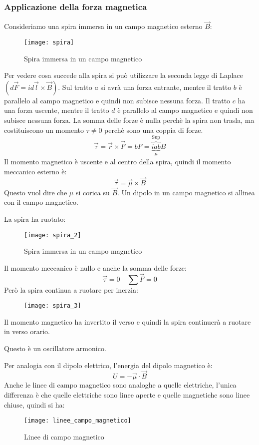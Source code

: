 \documentclass[a4paper]{article}
\begin{document}
\subsubsection{Applicazione della forza magnetica}
\begin{example}
  Consideriamo una spira immersa in un campo magnetico esterno \( \vec{B} \):
  \begin{figure}[H]
    \centering
    \texttt{[image: spira]}
    \caption{Spira immersa in un campo magnetico}
  \end{figure}
  \noindent
  Per vedere cosa succede alla spira si può utilizzare la seconda legge di Laplace
  \( \left( d\vec{F} = i d\vec{l} \times \vec{B} \right) \).
  Sul tratto \( a \) si avrà una forza entrante, mentre il tratto \( b \) è parallelo
  al campo magnetico e quindi non subisce nessuna forza. Il tratto \( c \) ha una
  forza uscente, mentre il tratto \( d \) è parallelo al campo magnetico e quindi
  non subisce nessuna forza.
  La somma delle forze è nulla perchè la spira non trasla,
  ma costituiscono un momento \( \tau \neq 0 \) perchè sono una coppia di forze.
  \[
    \vec{\tau} = \vec{r} \times \vec{F} = bF = \overbrace{\underbrace{iab}_{\mu}}^{\text{Sup}}B
  \]
  Il momento magnetico è uscente e al centro della spira, quindi il momento meccanico
  esterno è: 
  \[
   \vec{\tau} = \vec{\mu} \times \vec{B}
  \] 
  Questo vuol dire che \( \mu \) si corica su \( \vec{B} \).
  Un dipolo in un campo magnetico si allinea con il campo magnetico.

  \vspace{1em}
  \noindent
  La spira ha ruotato:
  \begin{figure}[H]
    \centering
    \texttt{[image: spira\_2]}
    \caption{Spira immersa in un campo magnetico}
  \end{figure}
  \noindent
  Il momento meccanico è nullo e anche la somma delle forze:
  \[
    \vec{\tau} = 0 \quad \sum \vec{F} = 0
  \] 
  Però la spira continua a ruotare per inerzia:
  \begin{figure}[H]
    \centering
    \texttt{[image: spira\_3]}
  \end{figure}
  \noindent
  Il momento magnetico ha invertito il verso e quindi la spira continuerà a ruotare in
  verso orario.

  Questo è un oscillatore armonico.

  \vspace{1em}
  \noindent
  Per analogia con il dipolo elettrico, l'energia del dipolo magnetico è:
  \[
    U = - \vec{\mu} \cdot \vec{B}
  \] 
  Anche le linee di campo magnetico sono analoghe a quelle elettriche, l'unica differenza
  è che quelle elettriche sono linee aperte e quelle magnetiche sono linee chiuse, quindi si ha:
  \begin{figure}[H]
    \centering
    \texttt{[image: linee\_campo\_magnetico]}
    \caption{Linee di campo magnetico}
  \end{figure}
\end{example}
\end{document}

